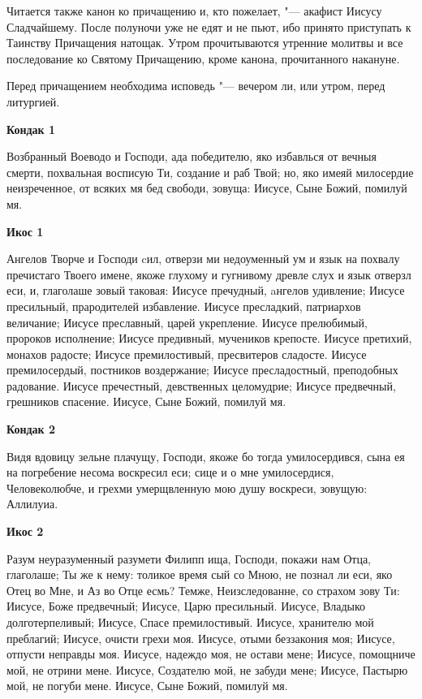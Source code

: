 Читается также канон ко причащению и, кто пожелает, "--- акафист Иисусу Сладчайшему. После полуночи уже не едят и не пьют, ибо принято приступать к Таинству Причащения натощак. Утром прочитываются утренние молитвы и все последование ко Святому Причащению, кроме канона, прочитанного накануне.


Перед причащением необходима исповедь "--- вечером ли, или утром, перед литургией.
\normalfont{}

\mychapterending

 
\bfseries Кондак 1\normalfont{}


Возбранный  Воеводо и Господи, ада победителю, яко избавлься от вечныя смерти, похвальная восписую Ти, создание и раб Твой; но, яко имеяй милосердие неизреченное, от всяких мя бед свободи, зовуща: Иисусе, Сыне Божий, помилуй мя.


\medskip
\bfseries Икос 1\normalfont{}


Ангелов
Творче и Господи cил, отверзи ми недоуменный ум и язык на похвалу пречистаго Твоего имене, якоже глухому и гугнивому древле слух и язык отверзл еси, и, глаголаше зовый таковая: Иисусе пречудный, aнгелов удивление; Иисусе пресильный, прародителей избавление. Иисусе пресладкий, патриархов величание; Иисусе преславный, царей укрепление. Иисусе прелюбимый, пророков исполнение; Иисусе предивный, мучеников крепосте. Иисусе претихий, монахов радосте; Иисусе премилостивый,
пресвитеров сладосте. Иисусе премилосердый, постников воздержание; Иисусе пресладостный, преподобных радование. Иисусе пречестный, девственных целомудрие; Иисусе предвечный, грешников спасение. Иисусе, Сыне Божий, помилуй мя.


\medskip
\bfseries Кондак 2\normalfont{}


Видя
вдовицу зельне плачущу, Господи, якоже бо тогда умилосердився, сына ея на погребение несома воскресил еси; сице и о мне умилосердися, Человеколюбче, и грехми умерщвленную мою душу воскреси, зовущую: Аллилуиа.


\medskip
\bfseries Икос 2\normalfont{}


Разум
неуразуменный разумети Филипп ища, Господи, покажи нам Отца, глаголаше; Ты же к нему: толикое время сый со Мною, не познал ли еси, яко Отец во Мне, и Аз во Отце есмь? Темже, Неизследованне, со страхом зову Ти: Иисусе, Боже предвечный; Иисусе, Царю пресильный. Иисусе, Владыко долготерпеливый; Иисусе, Спасе премилостивый. Иисусе, хранителю мой преблагий; Иисусе, очисти грехи моя. Иисусе, отыми беззакония моя; Иисусе, отпусти неправды моя. Иисусе, надеждо моя, не остави мене; Иисусе, помощниче мой, не отрини мене. Иисусе, Создателю мой, не забуди
мене; Иисусе, Пастырю мой, не погуби мене. Иисусе, Сыне Божий, помилуй мя.


